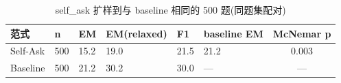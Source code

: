 \begin{table}[htbp]
\centering
\caption{self_ask 扩样到与 baseline 相同的 500 题(同题集配对)}
\begin{tabular}{llllllc}
\toprule
范式 & n & EM & EM(relaxed) & F1 & baseline EM & McNemar p \\
\midrule
Self-Ask & 500 & 15.2 & 19.0 & 21.5 & 21.2 & 0.003 \\
Baseline & 500 & 21.2 & 30.2 & 30.0 & — & — \\
\bottomrule
\end{tabular}
\end{table}
